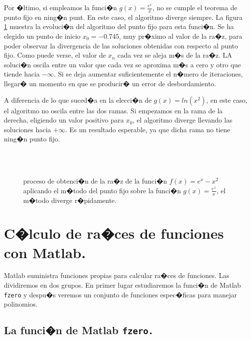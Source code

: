 Por �ltimo, si empleamos la funci�n $g(x)=\frac{e^x}{x}$, no se cumple el teorema de punto fijo en ning�n punt. En este caso, el algoritmo diverge siempre.  La figura \ref{fig:pfijo5} muestra la evoluci�n del algoritmo del punto fijo para esta funci�n. Se ha elegido un punto de inicio $x_0=-0.745$, muy pr�ximo al valor de la ra�z, para poder observar la divergencia de las soluciones obtenidas con respecto al punto fijo. Como puede verse, el valor de $x_n$ cada vez se aleja m�s de la ra�z. LA soluci�n oscila entre un valor que cada vez se aproxima m�s a cero y otro que tiende hacia $-\infty$. Si se deja aumentar suficientemente el n�mero de iteraciones, llegar� un momento en que se producir� un error de desbordamiento. 

A diferencia de lo que suced�a en la elecci�n de $g(x)=ln(x^2)$, en este caso, el algoritmo no oscila entre las dos ramas. Si empezamos en la rama de la derecha, eligiendo un valor positivo para $x_0$, el algoritmo diverge llevando las soluciones hacia $+\infty$. Es un resultado esperable, ya que dicha rama no tiene ning�n punto fijo.

\begin{figure}
\centering
{} \qquad
{}\\
\qquad
{}\\
\qquad
{}

\caption{proceso de obtenci�n de la ra�z de la funci�n $f(x)=e^x-x^2$ aplicando el m�todo del punto fijo sobre la funci�n $g(x)=\frac{e^x}{x}$, el m�todo diverge r�pidamente.}
\label{fig:pfijo5}
\end{figure}

\section{C�lculo de ra�ces de funciones con Matlab.}

Matlab suministra funciones propias para calcular ra�ces de funciones.  Las dividiremos en dos grupos. En primer lugar estudiaremos la funci�n de Matlab \texttt{fzero} y despu�s veremos un conjunto de funciones espec�ficas para manejar polinomios.

\subsection{La funci�n de Matlab \texttt{fzero.}}

